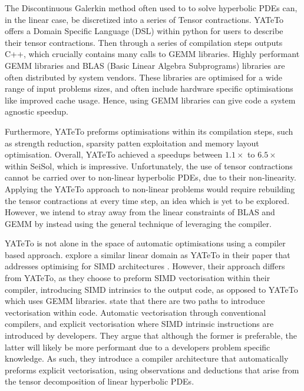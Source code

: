The Discontinuous Galerkin method often used to to solve hyperbolic PDEs can, in the linear case, be discretized into a series of Tensor contractions.
YATeTo offers a Domain Specific Language (DSL) within python for users to describe their tensor contractions.
Then through a series of compilation steps outputs C++, which crucially contains many calls to GEMM libraries.
Highly performant GEMM libraries and BLAS (Basic Linear Algebra Subprograms) libraries are often distributed by system vendors.
These libraries are optimised for a wide range of input problems sizes, and often include hardware specific optimisations like improved cache usage.
Hence, using GEMM libraries can give code a system agnostic speedup.

Furthermore, YATeTo preforms optimisations within its compilation steps, such as strength reduction, sparsity patten exploitation and memory layout optimisation.
Overall, YATeTo achieved a speedups between $1.1\times$ to $6.5 \times$ within SeiSol, which is impressive.
Unfortunately, the use of tensor contractions cannot be carried over to non-linear hyperbolic PDEs, due to their non-linearity.
Applying the YATeTo approach to non-linear problems would require rebuilding the tensor contractions at every time step, an idea which is yet to be explored.
However, we intend to stray away from the linear constraints of BLAS and GEMM by instead using the general technique of leveraging the compiler.   





YATeTo is not alone in the space of automatic optimisations using a compiler based approach.
\citeauthor{codegen_dg_SIMD} explore a similar linear domain as YATeTo in their paper that addresses optimising for SIMD architectures \cite{codegen_dg_SIMD}. 
However, their approach differs from YATeTo, as they choose to preform SIMD vectorisation within their compiler, introducing SIMD intrinsics to the output code, as opposed to YATeTo which uses GEMM libraries.
\citeauthor{codegen_dg_SIMD} state that there are two paths to introduce vectorisation within code.
Automatic vectorisation through conventional compilers, and explicit vectorisation where SIMD intrinsic instructions are introduced by developers.
They argue that although the former is preferable, the latter will likely be more performant due to a developers problem specific knowledge.
As such, they introduce a compiler architecture that automatically preforms explicit vectorisation, using observations and deductions that arise from the tensor decomposition of linear hyperbolic PDEs.

